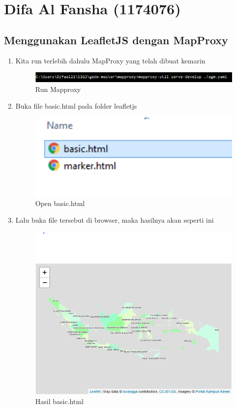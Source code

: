\section{Difa Al Fansha (1174076)}
\subsection{Menggunakan LeafletJS dengan MapProxy}
\begin{enumerate}
	\item Kita run terlebih dahulu MapProxy yang telah dibuat kemarin
    \hfill\break
    \begin{figure}[H]
		\includegraphics[width=12cm]{figures/Tugas5/1174076/1.png}
		\centering
		\caption{Run Mapproxy}
	\end{figure}
	
	\item Buka file basic.html pada folder leafletjs
    \hfill\break
    \begin{figure}[H]
		\includegraphics[width=12cm]{figures/Tugas5/1174076/2.png}
		\centering
		\caption{Open basic.html}
	\end{figure}
	
	\item Lalu buka file tersebut di browser, maka hasilnya akan seperti ini
    \hfill\break
    \begin{figure}[H]
		\includegraphics[width=12cm]{figures/Tugas5/1174076/3.png}
		\centering
		\caption{Hasil basic.html}
	\end{figure}
	

\end{enumerate}
